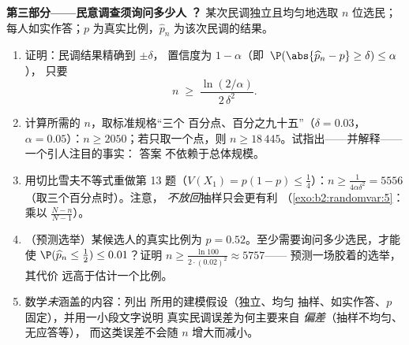 \begin{problem}
\medskip
\noindent\textbf{第三部分——民意调查须询问多少人
？} 某次民调独立且均匀地选取 $n$ 位选民；
每人如实作答；$p$ 为真实比例，$\widehat p_n$
为该次民调的结果。
\begin{enumerate}[resume]
  \item 证明：民调结果精确到 $\pm\delta$，
        置信度为 $1 - \alpha$（即\
        $\P(\abs{\widehat p_n - p} \geq \delta) \leq \alpha$），
        只要
        \[
        n \;\geq\; \frac{\ln(2/\alpha)}{2\,\delta^2} .
        \]
  \item 计算所需的 $n$，取标准规格“三个
        百分点、百分之九十五”（$\delta
        = 0.03$，$\alpha = 0.05$）：$n \geq 2050$；若只取一个点，则
        $n \geq 18\,445$。试指出——并解释——一个引人注目的事实：
        答案
        不依赖于总体规模。
  \item 用切比雪夫不等式重做第 13 题（$V(X_1) = p(1-p)
        \leq \frac14$）：$n \geq \frac1{4\alpha\delta^2} =
        5556$（取三个百分点时）。注意，
        \emph{不放回}抽样只会更有利
        （\cref{exo:b2:randomvar:5}：乘以
        $\frac{N-n}{N-1}$）。
  \item （预测选举）某候选人的真实比例为 $p
        = 0.52$。至少需要询问多少选民，才能使
        $\P(\widehat p_n \leq \tfrac12) \leq 0.01$？证明 $n
        \geq \frac{\ln 100}{2\cdot(0.02)^2} \approx 5757$——
        预测一场胶着的选举，其代价
        远高于估计一个比例。
  \item 数学\emph{未}涵盖的内容：列出
        所用的建模假设（独立、均匀
        抽样、如实作答、$p$ 固定），并用一小段文字说明
        真实民调误差为何主要来自
        \emph{偏差}（抽样不均匀、无应答等），
        而这类误差不会随 $n$ 增大而减小。
\end{enumerate}


\end{problem}
